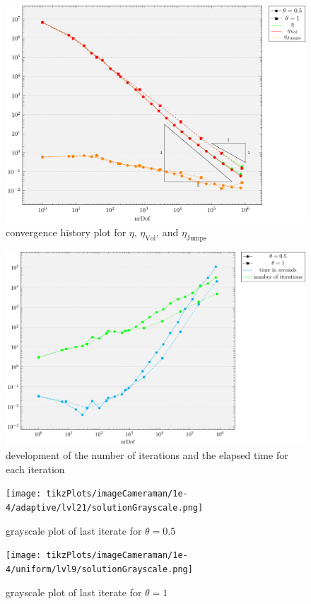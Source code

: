 \documentclass[draft=false,twoside,12pt]{scrreprt}
\begin{document}
\begin{figure}[H]
	\centering
	\includegraphics[width=14cm]
  {tikzPlots/imageCameraman/convergence.pdf}
  \caption{convergence history plot for $\eta$,
  $\eta_\text{Vol}$, and $\eta_\text{Jumps}$}
\end{figure}

\begin{figure}[H]
	\centering
	\includegraphics[width=14cm]{tikzPlots/imageCameraman/misc.pdf}
  \caption{development of the number of iterations and the elapsed time for 
  each iteration}
\end{figure}

\begin{minipage}[t]{0.5\textwidth}
  \begin{figure}[H]
	  \centering
		\texttt{[image: tikzPlots/imageCameraman/1e-4/adaptive/lvl21/solutionGrayscale.png]}
    \caption{grayscale plot of last iterate for $\theta = 0.5$}
  \end{figure}
\end{minipage}
\begin{minipage}[t]{0.5\textwidth}
  \begin{figure}[H]
	  \centering
		\texttt{[image: tikzPlots/imageCameraman/1e-4/uniform/lvl9/solutionGrayscale.png]}
    \caption{grayscale plot of last iterate for $\theta = 1$}
  \end{figure}
\end{minipage}
\end{document}
